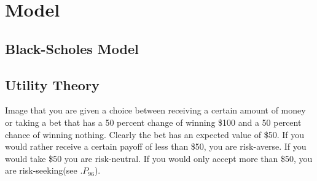 \chapter{Model}

\section{Black-Scholes Model}

\section{Utility Theory}

Image that you are given a choice between receiving a certain amount of money or taking a bet that has a 50 percent change of winning \$100 and a 50 percent chance of winning nothing. Clearly the bet has an expected value
of \$50. If you would rather receive a certain payoff of less than \$50, you are risk-averse. If you would take \$50 you are risk-neutral. If you would only accept more than \$50, you are risk-seeking(see
\cite{Sinclair_2013}.$P_{96}$).


